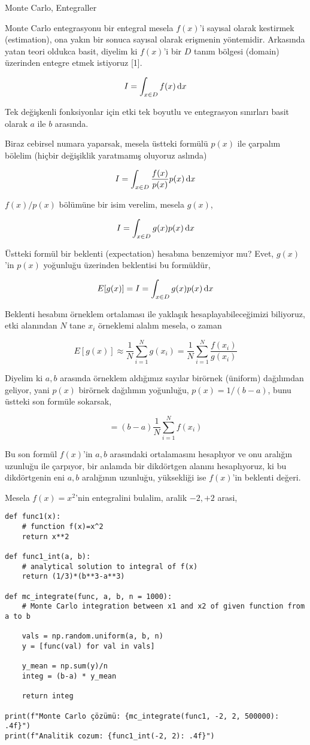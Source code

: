 \documentclass[12pt,fleqn]{article}\usepackage{../../common}
\begin{document}
Monte Carlo, Entegraller

Monte Carlo entegrasyonu bir entegral mesela $f(x)$'i sayısal olarak kestirmek
(estimation), ona yakın bir sonuca sayısal olarak erişmenin
yöntemidir. Arkasında yatan teori oldukca basit, diyelim ki $f(x)$'i bir $D$
tanım bölgesi (domain) üzerinden entegre etmek istiyoruz [1].

$$
I = \int_{x \in D} f(x) \,\mathrm{d} x
$$

Tek değişkenli fonksiyonlar için etki tek boyutlu ve entegrasyon sınırları
basit olarak $a$ ile $b$ arasında.

Biraz cebirsel numara yaparsak, mesela üstteki formülü $p(x)$ ile çarpalım
bölelim (hiçbir değişiklik yaratmamış oluyoruz aslında)

$$
I = \int_{x \in D} \frac{f(x)}{p(x)} p(x) \,\mathrm{d} x
$$

$f(x)/p(x)$ bölümüne bir isim verelim, mesela $g(x)$,

$$
I = \int_{x \in D} g(x) p(x) \,\mathrm{d} x
$$

Üstteki formül bir beklenti (expectation) hesabına benzemiyor mu? Evet,
$g(x)$'in $p(x)$ yoğunluğu üzerinden beklentisi bu formüldür, 

$$
E[g(x)] = I = \int_{x \in D} g(x) p(x) \,\mathrm{d} x
$$

Beklenti hesabını örneklem ortalaması ile yaklaşık hesaplayabileceğimizi
biliyoruz, etki alanından $N$ tane $x_i$ örneklemi alalım mesela, o zaman

$$
E[g(x)] \approx
\frac{1}{N} \sum_{i=1}^{N} g(x_i) =
\frac{1}{N} \sum_{i=1}^{N} \frac{f(x_i)}{g(x_i)}
$$

Diyelim ki $a,b$ arasında örneklem aldığımız sayılar birörnek (üniform)
dağılımdan geliyor, yani $p(x)$ birörnek dağılımın yoğunluğu, $p(x) = 1/(b-a)$,
bunu üstteki son formüle sokarsak,

$$
= (b-a) \frac{1}{N} \sum_{i=1}^{N} f(x_i) 
$$

Bu son formül $f(x)$'in $a,b$ arasındaki ortalamasını hesaplıyor ve onu aralığın
uzunluğu ile çarpıyor, bir anlamda bir dikdörtgen alanını hesaplıyoruz,
ki bu dikdörtgenin eni $a,b$ aralığının uzunluğu, yüksekliği ise $f(x)$'in
beklenti değeri.

Mesela $f(x) = x^2$'nin entegralini bulalim, aralik $-2,+2$ arasi,

\begin{verbatim}
def func1(x):
    # function f(x)=x^2
    return x**2

def func1_int(a, b):
    # analytical solution to integral of f(x)
    return (1/3)*(b**3-a**3)
  
def mc_integrate(func, a, b, n = 1000):
    # Monte Carlo integration between x1 and x2 of given function from a to b
    
    vals = np.random.uniform(a, b, n)
    y = [func(val) for val in vals]
    
    y_mean = np.sum(y)/n
    integ = (b-a) * y_mean
    
    return integ

print(f"Monte Carlo çözümü: {mc_integrate(func1, -2, 2, 500000): .4f}")
print(f"Analitik cozum: {func1_int(-2, 2): .4f}")
\end{verbatim}
\end{document}
